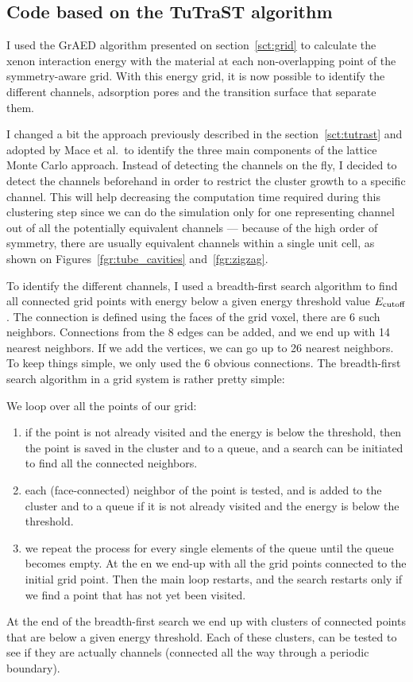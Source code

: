 \documentclass[main]{subfiles}
\begin{document}
\subsection{Code based on the TuTraST algorithm}

I used the GrAED algorithm presented on section~\ref{sct:grid} to calculate the xenon interaction energy with the material at each non-overlapping point of the symmetry-aware grid. With this energy grid, it is now possible to identify the different channels, adsorption pores and the transition surface that separate them. 

I changed a bit the approach previously described in the section~\ref{sct:tutrast} and adopted by Mace et al.\ to identify the three main components of the lattice Monte Carlo approach. Instead of detecting the channels on the fly, I decided to detect the channels beforehand in order to restrict the cluster growth to a specific channel. This will help decreasing the computation time required during this clustering step since we can do the simulation only for one representing channel out of all the potentially equivalent channels --- because of the high order of symmetry, there are usually equivalent channels within a single unit cell, as shown on Figures~\ref{fgr:tube_cavities} and~\ref{fgr:zigzag}. 

To identify the different channels, I used a breadth-first search algorithm to find all connected grid points with energy below a given energy threshold value $E_{\text{cutoff}}$. The connection is defined using the faces of the grid voxel, there are 6 such neighbors. Connections from the 8 edges can be added, and we end up with 14 nearest neighbors. If we add the vertices, we can go up to 26 nearest neighbors. To keep things simple, we only used the 6 obvious connections. The breadth-first search algorithm in a grid system is rather pretty simple:

We loop over all the points of our grid:
  \begin{enumerate}
    \item if the point is not already visited and the energy is below the threshold, then the point is saved in the cluster and to a queue, and a search can be initiated to find all the connected neighbors. 
    \item each (face-connected) neighbor of the point is tested, and is added to the cluster and to a queue if it is not already visited and the energy is below the threshold.
    \item we repeat the process for every single elements of the queue until the queue becomes empty. At the en we end-up with all the grid points connected to the initial grid point. Then the main loop restarts, and the search restarts only if we find a point that has not yet been visited.
  \end{enumerate}
At the end of the breadth-first search we end up with clusters of connected points that are below a given energy threshold. Each of these clusters, can be tested to see if they are actually channels (connected all the way through a periodic boundary). 
\end{document}
